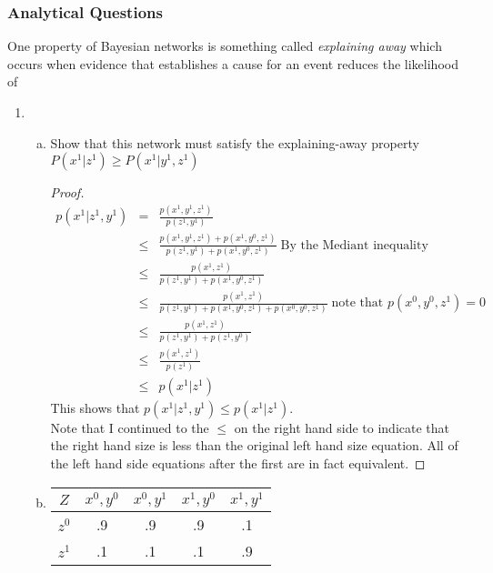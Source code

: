 \documentclass[12pt]{article}
\begin{document}
	\subsubsection{Analytical Questions}
	One property of Bayesian networks is something called \textit{explaining away }which occurs when
evidence that establishes a cause for an event reduces the likelihood of
		\begin{enumerate}
			\item	
				\begin{enumerate}[(a)]
					\item Show that this network must satisfy the explaining-away property $P(x^1|z^1) \geq P(x^1|y^1,z^1)$
					\begin{proof}
					\begin{eqnarray*}
						p(x^1|z^1,y^1) &=& \frac{p(x^1,y^1,z^1)}{p(z^1,y^1)} \\
												&\leq & \frac{p(x^1,y^1,z^1) + p(x^1,y^0,z^1)}{p(z^1,y^1) + p(x^1,y^0,z^1)}\; \text{By the Mediant inequality} \\
												&\leq & \frac{p(x^1,z^1)}{p(z^1,y^1) + p(x^1,y^0,z^1)} \\
												&\leq & \frac{p(x^1,z^1)}{p(z^1,y^1) + p(x^1,y^0,z^1) + p(x^0,y^0,z^1)}\; \text{note that } p(x^0,y^0,z^1) = 0 \\
												&\leq & \frac{p(x^1,z^1)}{p(z^1,y^1) + p(z^1,y^0)} \\
												&\leq & \frac{p(x^1,z^1)}{p(z^1)} \\
												&\leq & p(x^1|z^1)
					\end{eqnarray*}
					This shows that $p(x^1|z^1,y^1) \leq p(x^1|z^1)$. \\
					Note that I continued to the $\leq$ on the right hand side to indicate that the right hand size is less than the original left hand size equation. All of the left hand side equations after the first are in fact equivalent. 
					\end{proof}
						\item 
							\begin{tabular}{c||c c c c}
								$Z$ & $x^0,y^0$ & $x^0,y^1$ & $x^1,y^0$ & $x^1,y^1$  \\ \hline
								$z^0$ & .9 & .9 & .9 &  .1 \\
								$z^1$ & .1  & .1 & .1 & .9
							\end{tabular} \\
							

\end{enumerate}
\end{enumerate}
\end{document}
